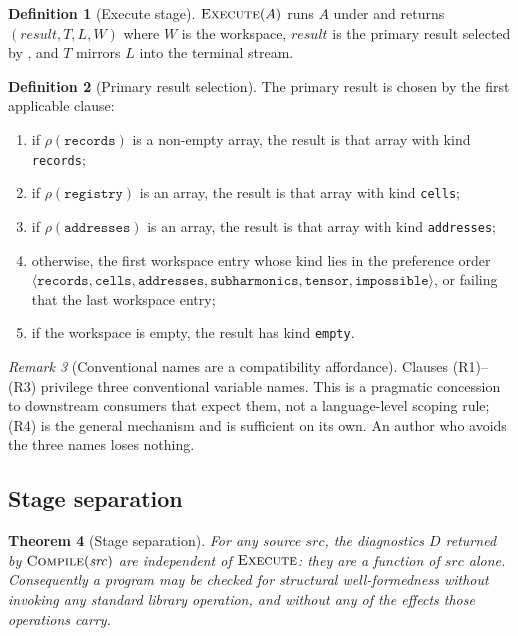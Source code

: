 \documentclass[11pt,twocolumn,a4paper]{article}
\theoremstyle{ssthm}
\newtheorem{theorem}{Theorem}[section]
\theoremstyle{definition}
\newtheorem{definition}[theorem]{Definition}
\theoremstyle{remark}
\newtheorem{remark}[theorem]{Remark}
\newcommand{\shk}[1]{\texttt{#1}}
\newcommand{\Env}{\rho}
\newcommand{\Wsp}{W}
\begin{document}
\begin{definition}[Execute stage]
\label{def:execute-stage}
$\textsc{Execute}(A)$ runs $A$ under  and returns
$(\mathit{result}, T, L, \Wsp)$ where $\Wsp$ is the workspace,
$\mathit{result}$ is the primary result selected by
, and $T$ mirrors $L$ into the terminal stream.
\end{definition}

\begin{definition}[Primary result selection]
\label{def:primary}
The primary result is chosen by the first applicable clause:
\begin{enumerate}[label=(R\arabic*),leftmargin=2.6em,itemsep=1pt]
\item if $\Env(\shk{records})$ is a non-empty array, the result is that
      array with kind \shk{records};
\item if $\Env(\shk{registry})$ is an array, the result is that array with
      kind \shk{cells};
\item if $\Env(\shk{addresses})$ is an array, the result is that array with
      kind \shk{addresses};
\item otherwise, the first workspace entry whose kind lies in the
      preference order
      $\langle\shk{records},\shk{cells},\shk{addresses},\shk{subharmonics},
      \shk{tensor},\shk{impossible}\rangle$, or failing that the last
      workspace entry;
\item if the workspace is empty, the result has kind \shk{empty}.
\end{enumerate}
\end{definition}

\begin{remark}[Conventional names are a compatibility affordance]
\label{rem:conventional}
Clauses (R1)--(R3) privilege three conventional variable names. This is
a pragmatic concession to downstream consumers that expect them, not a
language-level scoping rule; (R4) is the general mechanism and is
sufficient on its own. An author who avoids the three names loses
nothing.
\end{remark}

\subsection{Stage separation}

\begin{theorem}[Stage separation]
\label{thm:stage-separation}
For any source $\mathit{src}$, the diagnostics $D$ returned by
$\textsc{Compile}(\mathit{src})$ are independent of
$\textsc{Execute}$: they are a function of $\mathit{src}$ alone.
Consequently a program may be checked for structural well-formedness
without invoking any standard library operation, and without any of the
effects those operations carry.
\end{theorem}
\end{document}
